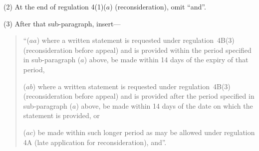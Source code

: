 \documentclass[12pt,a4paper]{article}
\begin{document}
(2) At the end of regulation 4(1)($a$)  (reconsideration), omit “and”.

(3) After that sub-paragraph, insert—
\begin{quotation}
“($aa$) where a written statement is requested under regulation~4B(3) (reconsideration before appeal) and is provided within the period specified in sub-paragraph ($a$)  above, be made within 14 days of the expiry of that period,

($ab$) where a written statement is requested under regulation~4B(3) (reconsideration before appeal) and is provided after the period specified in sub-paragraph ($a$)  above, be made within 14 days of the date on which the statement is provided, or

($ac$) be made within such longer period as may be allowed under regulation 4A (late application for reconsideration), and”.
\end{quotation}
\end{document}
